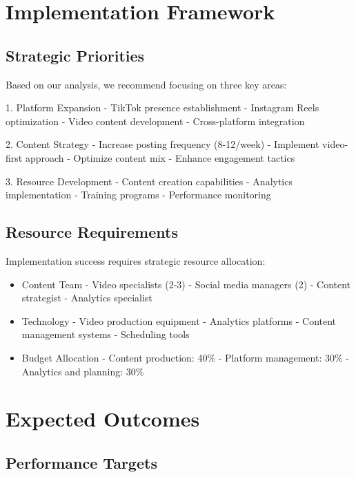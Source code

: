 \documentclass[12pt]{report}
\begin{document}
\chapter{Implementation Framework}

\section{Strategic Priorities}

Based on our analysis, we recommend focusing on three key areas:

1. Platform Expansion
   - TikTok presence establishment
   - Instagram Reels optimization
   - Video content development
   - Cross-platform integration

2. Content Strategy
   - Increase posting frequency (8-12/week)
   - Implement video-first approach
   - Optimize content mix
   - Enhance engagement tactics

3. Resource Development
   - Content creation capabilities
   - Analytics implementation
   - Training programs
   - Performance monitoring

\section{Resource Requirements}

Implementation success requires strategic resource allocation:

\begin{itemize}
    \item Content Team
        - Video specialists (2-3)
        - Social media managers (2)
        - Content strategist
        - Analytics specialist
    
    \item Technology
        - Video production equipment
        - Analytics platforms
        - Content management systems
        - Scheduling tools
    
    \item Budget Allocation
        - Content production: 40\%
        - Platform management: 30\%
        - Analytics and planning: 30\%
\end{itemize}

\chapter{Expected Outcomes}

\section{Performance Targets}
\end{document}
